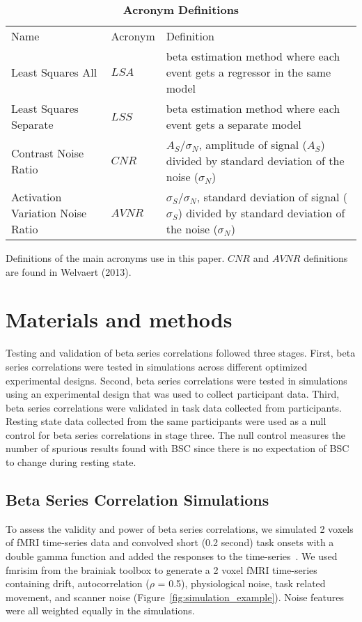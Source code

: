 \documentclass[phd,appendix,figures]{uithesis}
\begin{document}
\begin{table}[H]
  \centering
  \caption{
  {\bf Acronym Definitions}}
  \begin{tabular}{|l|l|p{60mm}|}
  \hline
  Name & Acronym & Definition\\
  Least Squares All & $LSA$ & beta estimation method where each event gets a regressor in the same model\\ \hline
  Least Squares Separate & $LSS$ & beta estimation method where each event gets a separate model\\ \hline
  Contrast Noise Ratio & $CNR$ & $A_S/\sigma_N$, amplitude of signal ($A_S$) divided by standard deviation of the noise ($\sigma_N$)\\ \hline
  Activation Variation Noise Ratio & $AVNR$ & $\sigma_S/\sigma_N$, standard deviation of signal ($\sigma_S$) divided by standard deviation of the noise ($\sigma_N$)\\ \hline
  \end{tabular}

  Definitions of the main acronyms use in this paper.
  $CNR$ and $AVNR$ definitions are found in Welvaert (2013)\cite{Welvaert2013a}.
  \label{table0}
\end{table}

\section*{Materials and methods}
\label{methods}

Testing and validation of beta series correlations followed three stages.
First, beta series correlations were tested in simulations across different
optimized experimental designs.
Second, beta series correlations were tested in simulations using an experimental
design that was used to collect participant data.
Third, beta series correlations were validated in task data collected from
participants.
Resting state data collected from the same participants were used as a null
control for beta series correlations in stage three.
The null control measures the number of spurious results found
with BSC since there is no expectation of BSC to change
during resting state.

\subsection*{Beta Series Correlation Simulations}
\label{methods:bsc-simulations}

To assess the validity and power of beta series correlations,
we simulated 2 voxels of fMRI time-series data and convolved short (0.2 second)
task onsets with a double gamma function
and added the responses to the time-series~\cite{Glover1999,Welvaert2011}.
We used fmrisim from the brainiak toolbox\cite{Ellis2020} to generate a
2 voxel fMRI time-series containing drift, autocorrelation ($\rho$ = 0.5), physiological noise,
task related movement, and scanner noise (Figure~\ref{fig:simulation_example}).
Noise features were all weighted equally in the simulations.
\end{document}
